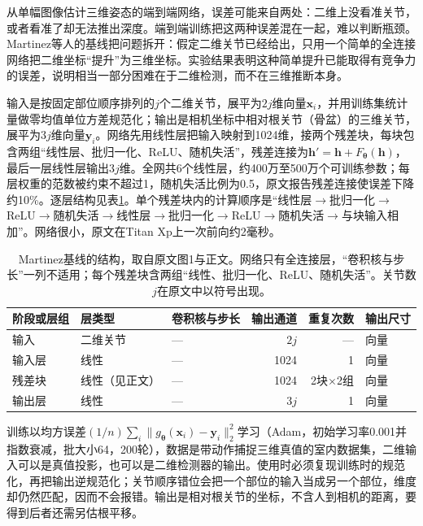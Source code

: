 从单幅图像估计三维姿态的端到端网络，误差可能来自两处：二维上没看准关节，或者看准了却无法推出深度。端到端训练把这两种误差混在一起，难以判断瓶颈。Martinez等人的基线把问题拆开：假定二维关节已经给出，只用一个简单的全连接网络把二维坐标“提升”为三维坐标。实验结果表明这种简单提升已能取得有竞争力的误差，说明相当一部分困难在于二维检测，而不在三维推断本身。

输入是按固定部位顺序排列的$j$个二维关节，展平为$2j$维向量$\bm{x}_i$，并用训练集统计量做零均值单位方差规范化；输出是相机坐标中相对根关节（骨盆）的三维关节，展平为$3j$维向量$\bm{y}_i$。网络先用线性层把输入映射到1024维，接两个残差块，每块包含两组“线性层、批归一化、ReLU、随机失活”，残差连接为$\bm{h}'=\bm{h}+F_{\bm{\theta}}(\bm{h})$，最后一层线性层输出$3j$维。全网共6个线性层，约400万至500万个可训练参数；每层权重的范数被约束不超过1，随机失活比例为0.5，原文报告残差连接使误差下降约10\%。逐层结构见表\ref{tab:vision-recognition-martinez-layers}。单个残差块内的计算顺序是“线性层$\to$批归一化$\to$ReLU$\to$随机失活$\to$线性层$\to$批归一化$\to$ReLU$\to$随机失活$\to$与块输入相加”。网络很小，原文在Titan Xp上一次前向约2毫秒。

\begin{table}[tbp]
 \centering
 \small
 \begin{tabular}{@{}lllrrl@{}}
 \toprule
 阶段或层组 & 层类型 & 卷积核与步长 & 输出通道 & 重复次数 & 输出尺寸\\
 \midrule
 输入 & 二维关节 & — & $2j$ & — & 向量\\
 输入层 & 线性 & — & 1024 & 1 & 向量\\
 残差块 & 线性（见正文） & — & 1024 & 2块\ensuremath{\times}2组 & 向量\\
 输出层 & 线性 & — & $3j$ & 1 & 向量\\
 \bottomrule
 \end{tabular}
 \caption{Martinez基线的结构，取自原文图1与正文。网络只有全连接层，“卷积核与步长”一列不适用；每个残差块含两组“线性、批归一化、ReLU、随机失活”。关节数$j$在原文中以符号出现。}
 \label{tab:vision-recognition-martinez-layers}
\end{table}

训练以均方误差$(1/n)\sum_i\lVert g_{\bm{\theta}}(\bm{x}_i)-\bm{y}_i\rVert_2^2$学习（Adam，初始学习率0.001并指数衰减，批大小64，200轮），数据是带动作捕捉三维真值的室内数据集，二维输入可以是真值投影，也可以是二维检测器的输出。使用时必须复现训练时的规范化，再把输出逆规范化；关节顺序错位会把一个部位的输入当成另一个部位，维度却仍然匹配，因而不会报错。输出是相对根关节的坐标，不含人到相机的距离，要得到后者还需另估根平移。

